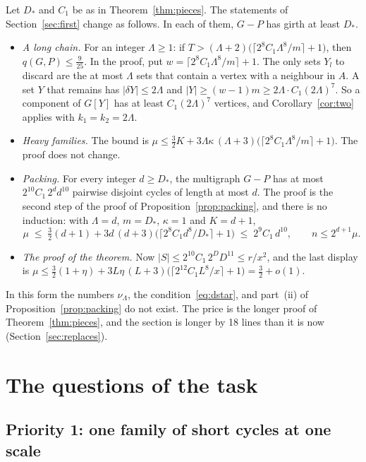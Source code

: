 \documentclass[11pt]{article}
\begin{document}
Let $D_*$ and $C_1$ be as in Theorem~\ref{thm:pieces}. The statements of
Section~\ref{sec:first} change as follows. In each of them, $G-P$ has girth at least $D_*$.
\begin{itemize}[leftmargin=1.2em]
\item \emph{A long chain.} For an integer $\Lambda\ge1$: if
$T>(\Lambda+2)\bigl(\lceil2^{8}C_1\Lambda^{8}/m\rceil+1\bigr)$, then $q(G,P)\le\frac9{25}$. In
the proof, put $w=\lceil2^{8}C_1\Lambda^{8}/m\rceil+1$. The only sets $Y_l$ to discard are the at
most $\Lambda$ sets that contain a vertex with a neighbour in $A$. A set $Y$ that remains has
$|\delta Y|\le2\Lambda$ and $|Y|\ge(w-1)m\ge2\Lambda\cdot C_1(2\Lambda)^{7}$. So a component of
$G[Y]$ has at least $C_1(2\Lambda)^{7}$ vertices, and Corollary~\ref{cor:two} applies with
$k_1=k_2=2\Lambda$.
\item \emph{Heavy families.} The bound is
$\mu\le\tfrac32K+3\Lambda\kappa\,(\Lambda+3)\bigl(\lceil2^{8}C_1\Lambda^{8}/m\rceil+1\bigr)$.
The proof does not change.
\item \emph{Packing.} For every integer $d\ge D_*$, the multigraph $G-P$ has at most
$2^{10}C_1\,2^{d}d^{10}$ pairwise disjoint cycles of length at most $d$. The proof is the second
step of the proof of Proposition~\ref{prop:packing}, and there is no induction: with
$\Lambda=d$, $m=D_*$, $\kappa=1$ and $K=d+1$,
\[
  \mu\;\le\;\tfrac32(d+1)+3d\,(d+3)\bigl(\lceil2^{8}C_1d^{8}/D_*\rceil+1\bigr)\;\le\;2^{9}C_1\,d^{10},
  \qquad n\le2^{d+1}\mu .
\]
\item \emph{The proof of the theorem.} Now $|S|\le2^{10}C_1\,2^{D}D^{11}\le r/x^{2}$, and the last
display is
$\mu\le\tfrac32(1+\eta)+3L\eta\,(L+3)\bigl(\lceil2^{12}C_1L^{8}/x\rceil+1\bigr)=\tfrac32+o(1)$.
\end{itemize}
In this form the numbers $\nu_\Lambda$, the condition~\eqref{eq:dstar}, and part~(ii) of
Proposition~\ref{prop:packing} do not exist. The price is the longer proof of
Theorem~\ref{thm:pieces}, and the section is longer by 18 lines than it is now
(Section~\ref{sec:replaces}).

\section{The questions of the task}\label{sec:answers}

\subsection{Priority 1: one family of short cycles at one scale}
\end{document}
